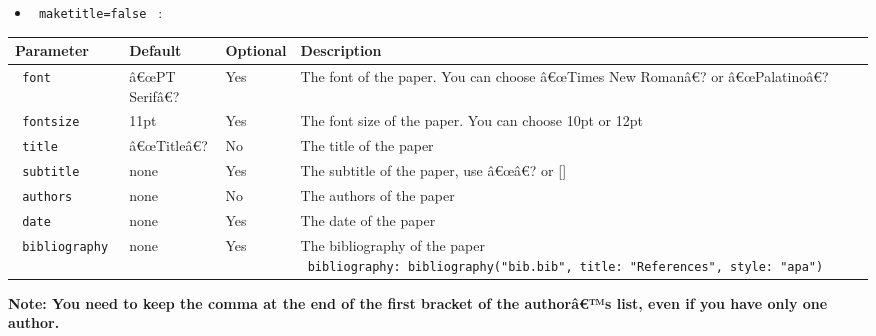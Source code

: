 \begin{itemize}
\tightlist
\item
  \texttt{\ maketitle=false\ } :
\end{itemize}

\begin{longtable}[]{@{}llll@{}}
\toprule\noalign{}
Parameter & Default & Optional & Description \\
\midrule\noalign{}
\endhead
\bottomrule\noalign{}
\endlastfoot
\texttt{\ font\ } & â€œPT Serifâ€? & Yes & The font of the paper. You
can choose â€œTimes New Romanâ€? or â€œPalatinoâ€? \\
\texttt{\ fontsize\ } & 11pt & Yes & The font size of the paper. You can
choose 10pt or 12pt \\
\texttt{\ title\ } & â€œTitleâ€? & No & The title of the paper \\
\texttt{\ subtitle\ } & none & Yes & The subtitle of the paper, use
â€œâ€? or {[}{]} \\
\texttt{\ authors\ } & none & No & The authors of the paper \\
\texttt{\ date\ } & none & Yes & The date of the paper \\
\texttt{\ bibliography\ } & none & Yes & The bibliography of the paper
\texttt{\ bibliography:\ bibliography("bib.bib",\ title:\ "References",\ style:\ "apa")\ } \\
\end{longtable}

\textbf{Note: You need to keep the comma at the end of the first bracket
of the authorâ€™s list, even if you have only one author.}

\begin{Shaded}
\begin{Highlighting}[]
\NormalTok{    (}
\NormalTok{    ),}
\end{Highlighting}
\end{Shaded}

